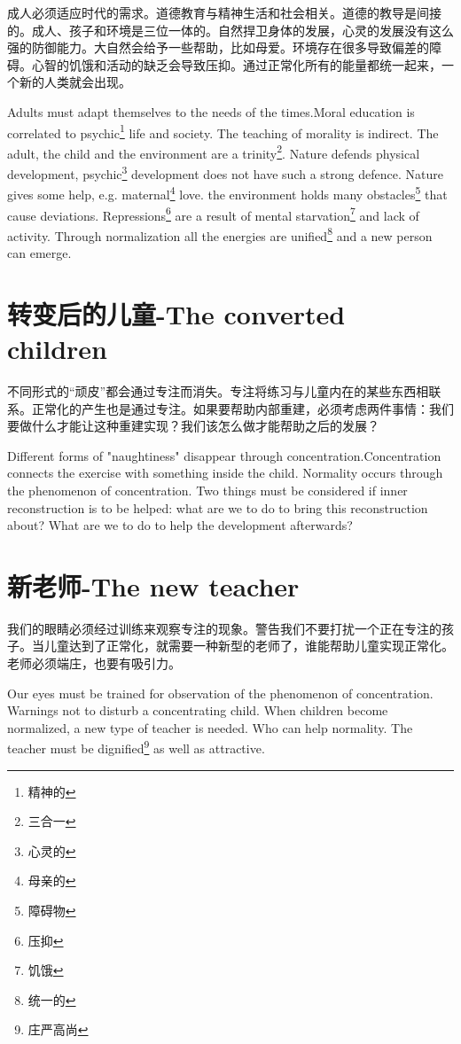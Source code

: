 \documentclass[lang=cn,10pt]{elegantbook}
\begin{document}
成人必须适应时代的需求。道德教育与精神生活和社会相关。道德的教导是间接的。成人、孩子和环境是三位一体的。自然捍卫身体的发展，心灵的发展没有这么强的防御能力。大自然会给予一些帮助，比如母爱。环境存在很多导致偏差的障碍。心智的饥饿和活动的缺乏会导致压抑。通过正常化所有的能量都统一起来，一个新的人类就会出现。

Adults must adapt themselves to the needs of the times.Moral education is correlated to psychic\footnote{精神的} life and society. The teaching of morality is indirect. The adult, the child and the environment are a trinity\footnote{三合一}. Nature defends physical development, psychic\footnote{心灵的} development does not have such a strong defence. Nature gives some help, e.g. maternal\footnote{母亲的} love. the environment holds many obstacles\footnote{障碍物} that cause deviations. Repressions\footnote{压抑} are a result of mental starvation\footnote{饥饿} and lack of activity. Through normalization all the energies are unified\footnote{统一的} and a new person can emerge.

\chapter{转变后的儿童-The converted children}

不同形式的“顽皮”都会通过专注而消失。专注将练习与儿童内在的某些东西相联系。正常化的产生也是通过专注。如果要帮助内部重建，必须考虑两件事情：我们要做什么才能让这种重建实现？我们该怎么做才能帮助之后的发展？

Different forms of "naughtiness" disappear through concentration.Concentration connects the exercise with something inside the child. Normality occurs through the phenomenon of concentration. Two things must be considered if inner reconstruction is to be helped: what are we to do to bring this reconstruction about? What are we to do to help the development afterwards?

\chapter{新老师-The new teacher}

我们的眼睛必须经过训练来观察专注的现象。警告我们不要打扰一个正在专注的孩子。当儿童达到了正常化，就需要一种新型的老师了，谁能帮助儿童实现正常化。老师必须端庄，也要有吸引力。

Our eyes must be trained for observation of the phenomenon of concentration. Warnings not to disturb a concentrating child. When children become normalized, a new type of teacher is needed. Who can help normality. The teacher must be dignified\footnote{庄严高尚} as well as attractive.
\end{document}
